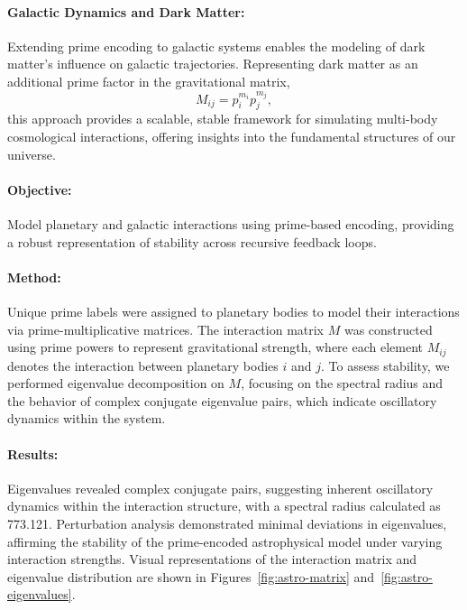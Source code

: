 \documentclass{article}
\begin{document}
\paragraph{Galactic Dynamics and Dark Matter:} Extending prime encoding to galactic systems enables the modeling of dark matter’s influence on galactic trajectories. Representing dark matter as an additional prime factor in the gravitational matrix,
\begin{equation}
    M_{ij} = p_i^{m_i} p_j^{m_j},
\end{equation}
this approach provides a scalable, stable framework for simulating multi-body cosmological interactions, offering insights into the fundamental structures of our universe.

\paragraph{Objective:} Model planetary and galactic interactions using prime-based encoding, providing a robust representation of stability across recursive feedback loops.

\paragraph{Method:} Unique prime labels were assigned to planetary bodies to model their interactions via prime-multiplicative matrices. The interaction matrix \( M \) was constructed using prime powers to represent gravitational strength, where each element \( M_{ij} \) denotes the interaction between planetary bodies \( i \) and \( j \). To assess stability, we performed eigenvalue decomposition on \( M \), focusing on the spectral radius and the behavior of complex conjugate eigenvalue pairs, which indicate oscillatory dynamics within the system.

\paragraph{Results:} Eigenvalues revealed complex conjugate pairs, suggesting inherent oscillatory dynamics within the interaction structure, with a spectral radius calculated as 773.121. Perturbation analysis demonstrated minimal deviations in eigenvalues, affirming the stability of the prime-encoded astrophysical model under varying interaction strengths. Visual representations of the interaction matrix and eigenvalue distribution are shown in Figures~\ref{fig:astro-matrix} and~\ref{fig:astro-eigenvalues}.
\end{document}

